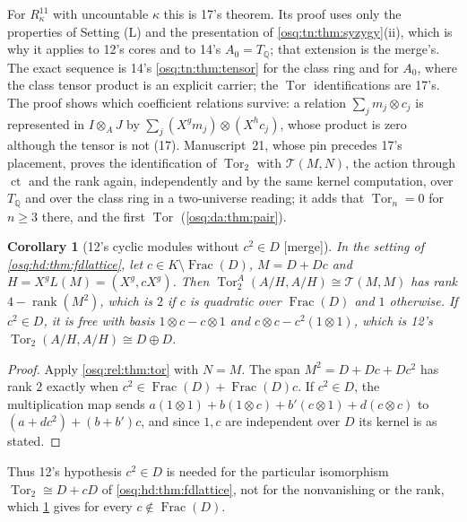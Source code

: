 \documentclass[11pt,letterpaper]{article}
\numberwithin{equation}{section}
\newtheorem{corollary}[corollary]{Corollary}
\theoremstyle{definition}
\theoremstyle{remark}
\theoremstyle{plain}
\newcommand{\Q}{\mathbb Q}
\newcommand{\ct}{\operatorname{ct}}
\newcommand{\Frac}{\operatorname{Frac}}
\newcommand{\Tor}{\operatorname{Tor}}
\newcommand{\rk}{\operatorname{rank}}
\newcommand{\merge}{\textup{\textsf{[merge]}}}
\begin{document}
For $R^{11}_\kappa$ with uncountable $\kappa$ this is 17's theorem. Its proof uses only the properties of Setting (L) and the
presentation of \cref{osq:tn:thm:syzygy}(ii), which is why it applies to 12's cores and to 14's $A_0=T_\Q$; that extension is the
merge's. The exact sequence is 14's \cref{osq:tn:thm:tensor} for the class ring and for $A_0$, where the class tensor product is an
explicit carrier; the $\Tor$ identifications are 17's. The proof shows which coefficient relations survive: a relation
$\sum_jm_j\otimes c_j$ is represented in $I\otimes_AJ$ by $\sum_j(X^gm_j)\otimes(X^hc_j)$, whose product is zero although the tensor
is not (17). Manuscript~21, whose pin precedes 17's placement, proves the identification of $\Tor_2$ with $\mathcal T(M,N)$, the action
through $\ct$ and the rank again, independently and by the same kernel computation, over $T_\Q$ and over the class ring in a two-universe
reading; it adds that $\Tor_n=0$ for $n\ge3$ there, and the first $\Tor$ (\cref{osq:da:thm:pair}).

\begin{corollary}[12's cyclic modules without $c^2\in D$ \merge]\label{osq:rel:cor:twelve}
In the setting of \cref{osq:hd:thm:fdlattice}, let $c\in K\setminus\Frac(D)$, $M=D+Dc$ and $H=X^gL(M)=(X^g,cX^g)$. Then
$\Tor^A_2(A/H,A/H)\cong\mathcal T(M,M)$ has rank $4-\rk(M^2)$, which is $2$ if $c$ is quadratic over $\Frac(D)$ and $1$ otherwise.
If $c^2\in D$, it is free with basis $1\otimes c-c\otimes1$ and $c\otimes c-c^2(1\otimes1)$, which is 12's
$\Tor_2(A/H,A/H)\cong D\oplus D$.
\end{corollary}
\begin{proof}
Apply \cref{osq:rel:thm:tor} with $N=M$. The span $M^2=D+Dc+Dc^2$ has rank $2$ exactly when $c^2\in\Frac(D)+\Frac(D)c$. If $c^2\in D$,
the multiplication map sends $a(1\otimes1)+b(1\otimes c)+b'(c\otimes1)+d(c\otimes c)$ to $(a+dc^2)+(b+b')c$, and since $1,c$ are
independent over $D$ its kernel is as stated.
\end{proof}

Thus 12's hypothesis $c^2\in D$ is needed for the particular isomorphism $\Tor_2\cong D+cD$ of \cref{osq:hd:thm:fdlattice}, not for
the nonvanishing or the rank, which \cref{osq:rel:cor:twelve} gives for every $c\notin\Frac(D)$.
\end{document}
